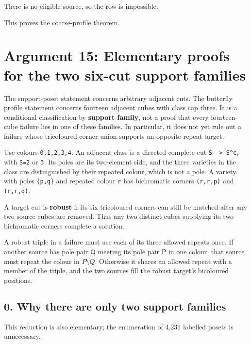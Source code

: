 \documentclass[
  10pt,
]{article}
\begin{document}
There is no eligible source, so the row is impossible.

This proves the coarse-profile theorem.

\hypertarget{arg-15}{%
\section{Argument 15: Elementary proofs for the two six-cut support
families}\label{arg-15}}

The support-poset statement concerns arbitrary adjacent cuts. The
butterfly profile statement concerns fourteen adjacent cubes with class
cap three. It is a conditional classification by \textbf{support
family}, not a proof that every fourteen-cube failure lies in one of
these families. In particular, it does not yet rule out a failure whose
tricoloured-corner union supports an opposite-repeat target.

Use colours \texttt{0,1,2,3,4}. An adjacent class is a directed complete
cut \texttt{S\ -\textgreater{}\ S\^{}c}, with
\texttt{\textbar{}S\textbar{}=2} or \texttt{3}. Its poles are its
two-element side, and the three varieties in the class are distinguished
by their repeated colour, which is not a pole. A variety with poles
\texttt{\{p,q\}} and repeated colour \texttt{r} has bichromatic corners
\texttt{(r,r,p)} and \texttt{(r,r,q)}.

A target cut is \textbf{robust} if its six tricoloured corners can still
be matched after any two source cubes are removed. Thus any two distinct
cubes supplying its two bichromatic corners complete a solution.

A robust triple in a failure must use each of its three allowed repeats
once. If another source has pole pair Q meeting its pole pair P in one
colour, that source must repeat the colour in \(P\setminus Q\).
Otherwise it shares an allowed repeat with a member of the triple, and
the two sources fill the robust target's bicoloured positions.

\hypertarget{why-there-are-only-two-support-families}{%
\subsection*{0. Why there are only two support
families}\label{why-there-are-only-two-support-families}}

This reduction is also elementary; the enumeration of 4,231 labelled
posets is unnecessary.
\end{document}
